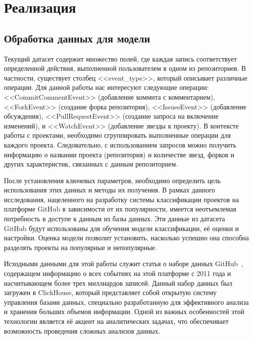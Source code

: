 \newpage
\section{Реализация}
\label{sec:Realization}

 \fxnote{} 

\subsection{Обработка данных для модели}
\label{subsec:Parser}

 Текущий датасет содержит множество полей, где каждая запись соответствует определенной действия, выполненной пользователем в одном из репозиториев. В частности, существует столбец <<event\_type>>, который описывает различные операции. Для данной работы нас интересуют следующие операции: <<CommitCommentEvent>> (добавление коммита с комментарием), <<ForkEvent>> (создание форка репозитория), <<IssuesEvent>> (добавление обсуждения), <<PullRequestEvent>> (создание запроса на включение изменений), и <<WatchEvent>> (добавление звезды к проекту). В контексте работы с проектами, необходимо сгруппировать выполненные операции для каждого проекта. Следовательно, с использованием запросов можно получить информацию о названии проекта (репозитория) и количестве звезд, форков и других характеристик, связанных с данным репозиторием.

 После установления ключевых параметров, необходимо определить цель использования этих данных и методы их получения. В рамках данного исследования, нацеленного на разработку системы классификации проектов на платформе GitHub в зависимости от их популярности, имеется неотъемлемая потребность в доступе к данным из базы данных. Эти данные из датасета GitHub будут использованы для обучения модели классификации, её оценки и настройки. Оценка модели позволит установить, насколько успешно она способна разделять проекты на популярные и непопулярные.

Исходными данными для этой работы служит статья о наборе данных GitHub~\cite{clickHouse}, содержащем информацию о всех событиях на этой платформе с 2011 года и насчитывающем более трех миллиардов записей. Данный набор данных был загружен в ClickHouse, который представляет собой открытую систему управления базами данных, специально разработанную для эффективного анализа и хранения больших объемов информации. Одной из важных особенностей этой технологии является её акцент на аналитических задачах, что обеспечивает возможность проведения сложных анализов данных.


